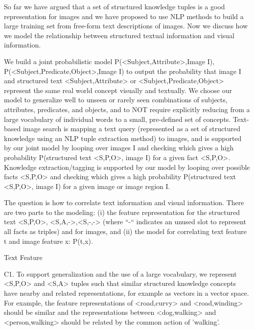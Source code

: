 \documentclass[runningheads]{llncs}
\begin{document}
So far we have argued that a set of structured knowledge tuples is a good representation for images and we have proposed to use NLP methods to build a large training set from free-form text descriptions of images. Now we discuss how we model the relationship between structured textual information and visual information. 

We build a joint probabilistic model P(<Subject,Attribute>,Image I), P(<Subject,Predicate,Object>,Image I) to output the probability that image I and structured text <Subject,Attribute> or <Subject,Predicate,Object> represent the same real world concept visually and textually. We choose our model to generalize well to unseen or rarely seen combinations of subjects, attributes, predicates, and objects, and to NOT require explicitly reducing from a large vocabulary of individual words to a small, pre-defined set of concepts. Text-based image search is mapping a text query (represented as a set of structured knowledge using an NLP tuple extraction method) to images, and is supported by our joint model by looping over images I and checking which gives a high probability P(structured text <S,P,O>, image I) for a given fact <S,P,O>. Knowledge extraction/tagging is supported by our model by looping over possible facts <S,P,O> and checking which gives a high probability P(structured text <S,P,O>, image I) for a given image or image region I.

The question is how to correlate text information and visual information. There are two parts to the modeling: (i) the feature representation for the structured text <S,P,O>, <S,A,->,<S,-,-> (where “-“ indicates an unused slot to represent all facts as triples) and for images, and (ii) the model for correlating text feature t and image feature x: P(t,x). 

Text Feature

C1. To support generalization and the use of a large vocabulary, we represent <S,P,O> and <S,A> tuples such that similar structured knowledge concepts have nearby and related representations, for example as vectors in a vector space. For example, the feature representations of <road,curvy> and <road,winding> should be similar and the representations between <dog,walking> and <person,walking> should be related by the common action of 'walking'.
\end{document}
